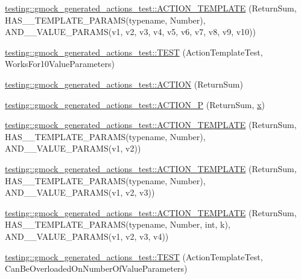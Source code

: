 \begin{DoxyCompactItemize}
\item 
\mbox{\hyperlink{namespacetesting_1_1gmock__generated__actions__test_a0e21a6c1f43a7125a29e6e1edcd7006c}{testing\+::gmock\+\_\+generated\+\_\+actions\+\_\+test\+::\+A\+C\+T\+I\+O\+N\+\_\+\+T\+E\+M\+P\+L\+A\+TE}} (Return\+Sum, H\+A\+S\+\_\+\_\+\+T\+E\+M\+P\+L\+A\+T\+E\+\_\+\+P\+A\+R\+A\+MS(typename, Number), A\+N\+D\+\_\+\_\+\+V\+A\+L\+U\+E\+\_\+\+P\+A\+R\+A\+MS(v1, v2, v3, v4, v5, v6, v7, v8, v9, v10))
\item 
\mbox{\hyperlink{namespacetesting_1_1gmock__generated__actions__test_aa8dd9ea1777fe67626bab2815b7261f4}{testing\+::gmock\+\_\+generated\+\_\+actions\+\_\+test\+::\+T\+E\+ST}} (Action\+Template\+Test, Works\+For10\+Value\+Parameters)
\item 
\mbox{\hyperlink{namespacetesting_1_1gmock__generated__actions__test_a49c180470c75de1ab88cd2928e738d33}{testing\+::gmock\+\_\+generated\+\_\+actions\+\_\+test\+::\+A\+C\+T\+I\+ON}} (Return\+Sum)
\item 
\mbox{\hyperlink{namespacetesting_1_1gmock__generated__actions__test_acae7628c76df0e3b54ea80459fe3cf60}{testing\+::gmock\+\_\+generated\+\_\+actions\+\_\+test\+::\+A\+C\+T\+I\+O\+N\+\_\+P}} (Return\+Sum, \mbox{\hyperlink{_obj__test_2lib_2googletest-master_2googlemock_2test_2gmock-matchers__test_8cc_a6150e0515f7202e2fb518f7206ed97dc}{x}})
\item 
\mbox{\hyperlink{namespacetesting_1_1gmock__generated__actions__test_a0d95dcce021580cf2a2af2a91348a01b}{testing\+::gmock\+\_\+generated\+\_\+actions\+\_\+test\+::\+A\+C\+T\+I\+O\+N\+\_\+\+T\+E\+M\+P\+L\+A\+TE}} (Return\+Sum, H\+A\+S\+\_\+\_\+\+T\+E\+M\+P\+L\+A\+T\+E\+\_\+\+P\+A\+R\+A\+MS(typename, Number), A\+N\+D\+\_\+\_\+\+V\+A\+L\+U\+E\+\_\+\+P\+A\+R\+A\+MS(v1, v2))
\item 
\mbox{\hyperlink{namespacetesting_1_1gmock__generated__actions__test_a5241672e22af49093d3601ac42c9a5ca}{testing\+::gmock\+\_\+generated\+\_\+actions\+\_\+test\+::\+A\+C\+T\+I\+O\+N\+\_\+\+T\+E\+M\+P\+L\+A\+TE}} (Return\+Sum, H\+A\+S\+\_\+\_\+\+T\+E\+M\+P\+L\+A\+T\+E\+\_\+\+P\+A\+R\+A\+MS(typename, Number), A\+N\+D\+\_\+\_\+\+V\+A\+L\+U\+E\+\_\+\+P\+A\+R\+A\+MS(v1, v2, v3))
\item 
\mbox{\hyperlink{namespacetesting_1_1gmock__generated__actions__test_a03e55dabaa60ff2cda602c702ef3ff76}{testing\+::gmock\+\_\+generated\+\_\+actions\+\_\+test\+::\+A\+C\+T\+I\+O\+N\+\_\+\+T\+E\+M\+P\+L\+A\+TE}} (Return\+Sum, H\+A\+S\+\_\+\_\+\+T\+E\+M\+P\+L\+A\+T\+E\+\_\+\+P\+A\+R\+A\+MS(typename, Number, int, k), A\+N\+D\+\_\+\_\+\+V\+A\+L\+U\+E\+\_\+\+P\+A\+R\+A\+MS(v1, v2, v3, v4))
\item 
\mbox{\hyperlink{namespacetesting_1_1gmock__generated__actions__test_aa84c5b4f29e052340459e12649ce7209}{testing\+::gmock\+\_\+generated\+\_\+actions\+\_\+test\+::\+T\+E\+ST}} (Action\+Template\+Test, Can\+Be\+Overloaded\+On\+Number\+Of\+Value\+Parameters)
\end{DoxyCompactItemize}
